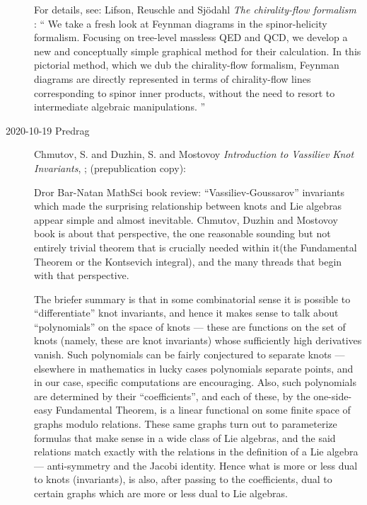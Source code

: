 \begin{description}
For details, see:
Lifson, Reuschle and Sj{\"o}dahl
{\em The chirality-flow formalism} : ``
We take a fresh look at Feynman diagrams in the spinor-helicity
formalism. Focusing on tree-level massless QED and QCD, we develop a new
and conceptually simple graphical method for their calculation. In this
pictorial method, which we dub the chirality-flow formalism, Feynman
diagrams are directly represented in terms of chirality-flow lines
corresponding to spinor inner products, without the need to resort to
intermediate algebraic manipulations. ''

\item[2020-10-19 Predrag]
Chmutov, S. and Duzhin, S. and Mostovoy
{\em Introduction to Vassiliev Knot Invariants},
;
{(prepublication copy)}:

Dror Bar-Natan
{MathSci book review}:
``Vassiliev-Goussarov'' invariants %
which made the surprising relationship between knots and Lie algebras
appear simple and almost inevitable. Chmutov, Duzhin and
Mostovoy book is about that perspective, the one reasonable
sounding but not entirely trivial theorem that is crucially needed within
it(the Fundamental Theorem or the Kontsevich integral), and the many
threads that begin with that perspective.

The briefer summary is that in some combinatorial sense it is possible to
``differentiate'' knot invariants, and hence it makes sense to talk about
``polynomials'' on the space of knots — these are functions on the set of
knots (namely, these are knot invariants) whose sufficiently high
derivatives vanish. Such polynomials can be fairly conjectured to separate
knots — elsewhere in mathematics in lucky cases polynomials separate
points, and in our case, specific computations are encouraging.  Also,
such polynomials are determined by their ``coefficients'', and each
of these, by the one-side-easy Fundamental Theorem, is a linear functional
on some finite space of graphs modulo relations. These same graphs turn
out to parameterize formulas that make sense in a wide class of Lie
algebras, and the said relations match exactly with the relations in the
definition of a Lie algebra — anti-symmetry and the Jacobi identity. Hence
what is more or less dual to knots (invariants), is also, after passing to
the coefficients, dual to certain graphs which are more or less dual to
Lie algebras.


\end{description}
